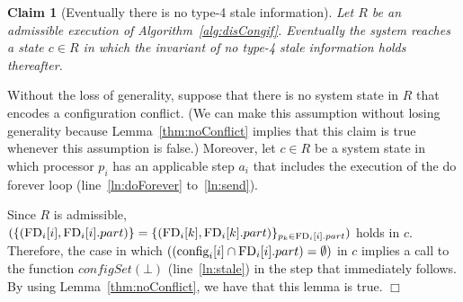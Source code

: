 \documentclass[11pt]{article}
\newtheorem{claim}[theorem]{Claim}
\newenvironment{proof}{\noindent{\bf Proof.}}{\hfill$\Box$}
\begin{document}
\begin{claim}[Eventually there is no type-4 stale information]
\label{thm:noStale4}
Let $R$ be an admissible execution of Algorithm~\ref{alg:disCongif}.
Eventually the system reaches a state $c \in R$ in which the invariant of no type-4 stale information holds thereafter.
\end{claim}
\begin{proof}
Without the loss of generality, suppose that there is no system state in $R$ that encodes a configuration conflict. (We can make this assumption without losing generality because Lemma~\ref{thm:noConflict} implies that this claim is true whenever this assumption is false.) Moreover, let $c \in R$ be a system state in which processor $p_i$ has an applicable step $a_i$ that includes the execution of the do forever loop (line~\ref{ln:doForever} to~\ref{ln:send}). 

Since $R$ is admissible, 
$(\{(\textnormal{FD}_i[i],\textnormal{FD}_i[i].part)\}=\{(\textnormal{FD}_i[k],\textnormal{FD}_i[k].part)\}_{p_k \in \textnormal{FD}_i[i].part})$ holds in $c$. Therefore, the case in which $((\textnormal{config}_i[i]\cap\textnormal{FD}_i[i].part) = \emptyset)$ in $c$ implies a call  to the function $configSet(\bot)$ (line~\ref{ln:stale}) in the step that immediately follows. By using Lemma~\ref{thm:noConflict}, we have that this lemma is true.
\end{proof}
\end{document}
